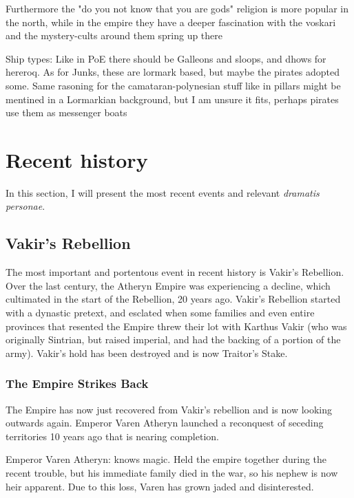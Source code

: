 Furthermore the "do you not know that you are gods" religion is more popular in the north, while in the empire they have a deeper fascination with the voskari and the mystery-cults around them spring up there




Ship types:
	Like in PoE there should be Galleons and sloops, and dhows for hereroq.
	As for Junks, these are lormark based, but maybe the pirates adopted some. Same rasoning for the camataran-polynesian stuff like in pillars might be mentined in a Lormarkian background, but I am unsure it fits, perhaps pirates use them as messenger boats





\section{Recent history}

\label{recent_history}

In this section, I will present the most recent events and relevant \textit{dramatis personae}.

\subsection{Vakir's Rebellion}

The most important and portentous event in recent history is Vakir's Rebellion. Over the last century, the Atheryn Empire was experiencing a decline, which cultimated in the start of the Rebellion, 20 years ago. Vakir's Rebellion started with a dynastic pretext, and esclated when some families and even entire provinces that resented the Empire threw their lot with Karthus Vakir (who was originally Sintrian, but raised imperial, and had the backing of a portion of the army). Vakir's hold has been destroyed and is now Traitor's Stake.


\subsubsection{The Empire Strikes Back}

The Empire has now just recovered from Vakir's rebellion and is now looking outwards again. Emperor Varen Atheryn launched a reconquest of seceding territories 10 years ago that is nearing completion.

Emperor Varen Atheryn: knows magic. Held the empire together during the recent trouble, but his immediate family died in the war, so his nephew is now heir apparent. Due to this loss, Varen has grown jaded and disinterested.

